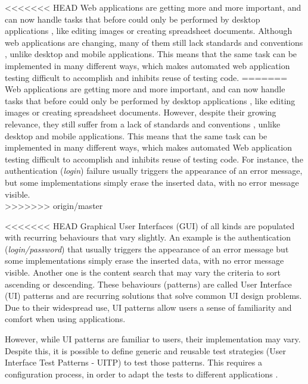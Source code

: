 \documentclass[conference]{IEEEtran}
\begin{document}
<<<<<<< HEAD
Web applications are getting more and more important, and can now handle tasks that before could only be performed by desktop applications \cite{garrett2005ajax}, like editing images or creating spreadsheet documents. 
Although web applications are changing, many of them still lack standards and conventions \cite{constantine2002usage, fraternali2010rich}, unlike desktop and mobile applications.
This means that the same task can be implemented in many different ways, which makes automated web application testing difficult to accomplish and inhibits reuse of testing code. 
=======
Web applications are getting more and more important, and can now handle tasks that before could only be performed by desktop applications \cite{garrett2005ajax}, like editing images or creating spreadsheet documents. However, despite their growing relevance, they still suffer from a lack of standards and conventions \cite{constantine2002usage}, unlike desktop and mobile applications. This means that the same task can be implemented in many different ways, which makes automated Web application testing difficult to accomplish and inhibits reuse of testing code. For instance, the authentication (\textit{login}) failure usually triggers the appearance of an error message, but some implementations simply erase the inserted data, with no error message visible.\\
>>>>>>> origin/master


<<<<<<< HEAD
Graphical User Interfaces (GUI) of all kinds are populated with recurring behaviours that vary slightly. An example is the authentication (\textit{login/password}) that usually triggers the appearance of an error message but some implementations simply erase the inserted data, with no error message visible. Another one is the content search that may vary the criteria to sort ascending or descending. 
These behaviours (patterns) are called User Interface (UI) patterns \cite{van2001patterns} and are recurring solutions that solve common UI design problems. Due to their widespread use, UI patterns allow users a sense of familiarity and comfort when using applications. 

However, while UI patterns are familiar to users, their implementation may vary.  Despite this, it is possible to define generic and reusable test strategies (User Interface Test Patterns - UITP) to test those patterns. This requires a configuration process, in order to adapt the tests to different applications \cite{morgado2012gui}. 
\end{document}
